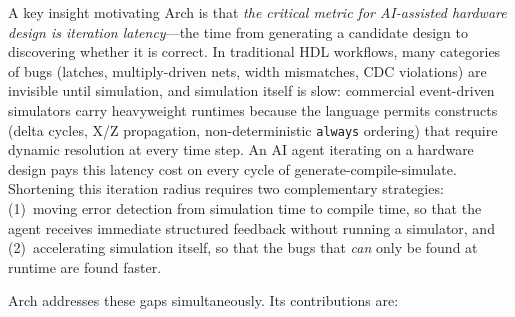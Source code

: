 \documentclass[manuscript]{acmart}
\begin{document}
A key insight motivating Arch is that \emph{the critical metric for AI-assisted hardware design is iteration latency}---the time from generating a candidate design to discovering whether it is correct. In traditional HDL workflows, many categories of bugs (latches, multiply-driven nets, width mismatches, CDC violations) are invisible until simulation, and simulation itself is slow: commercial event-driven simulators carry heavyweight runtimes because the language permits constructs (delta cycles, X/Z propagation, non-deterministic \texttt{always} ordering) that require dynamic resolution at every time step. An AI agent iterating on a hardware design pays this latency cost on every cycle of generate-compile-simulate. Shortening this iteration radius requires two complementary strategies: (1)~moving error detection from simulation time to compile time, so that the agent receives immediate structured feedback without running a simulator, and (2)~accelerating simulation itself, so that the bugs that \emph{can} only be found at runtime are found faster.

Arch addresses these gaps simultaneously. Its contributions are:
\end{document}
